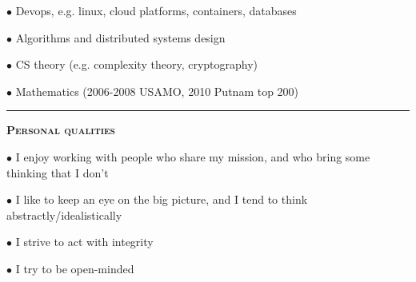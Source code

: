 \documentclass[11 pt]{article}
\begin{document}
$\bullet$ Devops, e.g. linux, cloud platforms, containers, databases %

$\bullet$ Algorithms and distributed systems design

$\bullet$ CS theory (e.g. complexity theory, cryptography) %

$\bullet$ Mathematics (2006-2008 USAMO, 2010 Putnam top 200)



\vspace{8 pt}

\hrule

\begin{center}\begin{Large}\textsc{\textbf{Personal qualities}\\}\end{Large}\end{center}

$\bullet$ I enjoy working with people who share my mission, and who bring some thinking that I don't

$\bullet$ I like to keep an eye on the big picture, and I tend to think abstractly/idealistically

$\bullet$ I strive to act with integrity

$\bullet$ I try to be open-minded

\end{document}
